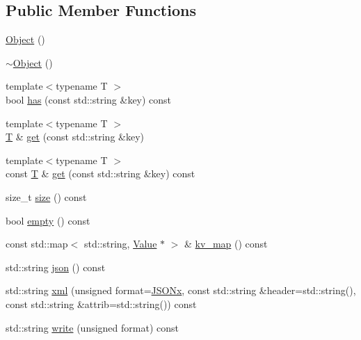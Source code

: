 \subsection*{Public Member Functions}
\begin{DoxyCompactItemize}
\item 
\hyperlink{classjsonxx_1_1_object_ada73d1b6614d97372349c2dc81fcf1cb}{Object} ()
\item 
\hyperlink{classjsonxx_1_1_object_ae4cfde759f40c3c6d7b75a7b24e6b98a}{$\sim$\+Object} ()
\item 
{\footnotesize template$<$typename T $>$ }\\bool \hyperlink{classjsonxx_1_1_object_addbf3358df897753b4b5957b1d1296d0}{has} (const std\+::string \&key) const 
\item 
{\footnotesize template$<$typename T $>$ }\\\hyperlink{http__parser_8c_ad24d0de3f597ca60dd95c4bc59c2ff73}{T} \& \hyperlink{classjsonxx_1_1_object_a15cfa259a8731a8d470b5679324f17ff}{get} (const std\+::string \&key)
\item 
{\footnotesize template$<$typename T $>$ }\\const \hyperlink{http__parser_8c_ad24d0de3f597ca60dd95c4bc59c2ff73}{T} \& \hyperlink{classjsonxx_1_1_object_a01913d98cbf89aa075a09dd56571b217}{get} (const std\+::string \&key) const 
\item 
size\+\_\+t \hyperlink{classjsonxx_1_1_object_a86962bd92e24121f2c94cf6406975a05}{size} () const 
\item 
bool \hyperlink{classjsonxx_1_1_object_aa6763556b7fb29a405fd489a13d67e2f}{empty} () const 
\item 
const std\+::map$<$ std\+::string, \hyperlink{classjsonxx_1_1_value}{Value} $\ast$ $>$ \& \hyperlink{classjsonxx_1_1_object_aec94c0de40e49993adeaf3a08502b514}{kv\+\_\+map} () const 
\item 
std\+::string \hyperlink{classjsonxx_1_1_object_a6af0b2df182bae783c22425c8ad01c83}{json} () const 
\item 
std\+::string \hyperlink{classjsonxx_1_1_object_a6bd2fbc3dc8a672645bf2545e89bc204}{xml} (unsigned format=\hyperlink{namespacejsonxx_a1dc6d8d59422ab47976163f874939455af38f9355cff13d4780a62c136d156160}{J\+S\+O\+Nx}, const std\+::string \&header=std\+::string(), const std\+::string \&attrib=std\+::string()) const 
\item 
std\+::string \hyperlink{classjsonxx_1_1_object_ad3737bea1e8eb0d6fcccb3a3541ea1d4}{write} (unsigned format) const 
\item 

\end{DoxyCompactItemize}
